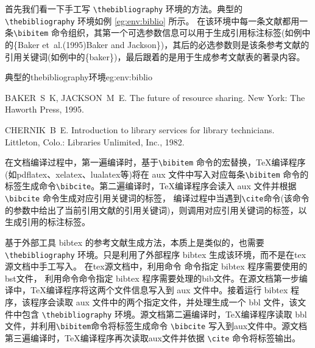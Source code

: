 \documentclass[twoside]{article} %
\begin{document}
首先我们看一下手工写 \verb|\thebibliography| 环境的方法。典型的 \verb|\thebibliography| 环境如例 \ref{eg:env:biblio} 所示。
在该环境中每一条文献都用一条\verb|\bibitem| 命令组织，其第一个可选参数信息可以用于生成引用标注标签(如例中的\{Baker et~al.(1995)Baker and Jackson\})，其后的必选参数则是该条参考文献的引用关键词(如例中的\{baker\})，最后跟着的是用于生成参考文献表的著录内容。


\begin{codetex}{典型的thebibliography环境}{eg:env:biblio}
\begin{thebibliography}{2}
BAKER~S~K, JACKSON~M~E. \newblock The future of resource sharing\allowbreak[M]. \newblock New York: The Haworth Press, 1995.

CHERNIK~B~E. \newblock Introduction to library services for library technicians\allowbreak[M]. \newblock Littleton, Colo.: Libraries Unlimited, Inc., 1982.
\end{thebibliography}
\end{codetex}

在文档编译过程中，第一遍编译时，基于\verb|\bibitem| 命令的宏替换，\TeX{}编译程序(如pdflatex、xelatex、lualatex等)将在 aux 文件中写入对应每条\verb|\bibitem| 命令的标签生成命令\verb|\bibcite|。第二遍编译时，\TeX{}编译程序会读入 aux 文件并根据\verb|\bibcite| 命令生成对应引用关键词的标签，
编译过程中当遇到\verb|\cite|命令(该命令的参数中给出了当前引用文献的引用关键词)，则调用对应引用关键词的标签，以生成引用的标注标签。

基于外部工具 bibtex 的参考文献生成方法，本质上是类似的，也需要\verb|\thebibliography| 环境。只是利用了外部程序 bibtex 生成该环境，而不是在tex源文档中手工写入。
在tex源文档中，利用命令 \verb|| 命令指定 bibtex 程序需要使用的bst文件，
利用命令\verb||命令指定 bibtex 程序需要处理的bib文件。在源文档第一步编译中，\TeX{}编译程序将这两个文件信息写入到 aux 文件中。接着运行 bibtex 程序，该程序会读取 aux 文件中的两个指定文件，并处理生成一个 bbl 文件，该文件中包含 \verb|\thebibliography| 环境。源文档第二遍编译时，\TeX{}编译程序读取 bbl 文件，并利用\verb|\bibitem|命令将标签生成命令 \verb|\bibcite| 写入到aux文件中。源文档第三遍编译时，\TeX{}编译程序再次读取aux文件并依据 \verb|\cite| 命令将标签输出。
\end{document}
